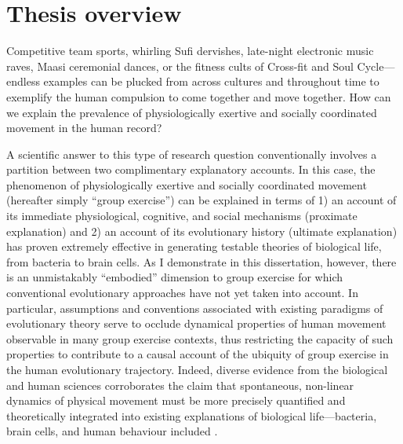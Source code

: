 \section{Thesis overview}

Competitive team sports, whirling Sufi dervishes, late-night electronic music raves, Maasi ceremonial dances, or the fitness cults of Cross-fit and Soul Cycle---endless examples can be plucked from across cultures and throughout time to exemplify the human compulsion to come together and move together.  How can we explain the prevalence of physiologically exertive and socially coordinated movement in the human record?

A scientific answer to this type of research question conventionally involves a partition between two complimentary explanatory accounts.  In this case, the phenomenon of physiologically exertive and socially coordinated movement (hereafter simply ``group exercise'') can be explained in terms of 1) an account of its immediate physiological, cognitive, and social mechanisms (proximate explanation) and 2) an account of its evolutionary history (ultimate explanation) has proven extremely effective in generating testable theories of biological life, from bacteria to brain cells.
As I demonstrate in this dissertation, however, there is an unmistakably ``embodied'' dimension to group exercise for which conventional evolutionary approaches have not yet taken into account. In particular, assumptions and conventions associated with existing paradigms of evolutionary theory serve to occlude dynamical properties of human movement observable in many group exercise contexts, thus restricting the capacity of such properties to contribute to a causal account of the ubiquity of group exercise in the human evolutionary trajectory.  Indeed, diverse evidence from the biological and human sciences corroborates the claim that spontaneous, non-linear dynamics of physical movement must be more precisely quantified and theoretically integrated into existing explanations of biological life---bacteria, brain cells, and human behaviour included \citep{Nowak2006,Kelso2016,Laland2011,Laland2015,Yufik2017a,Nowak2017}.

